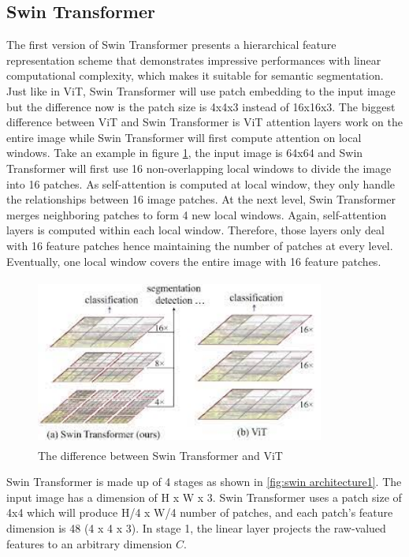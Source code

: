 \subsection{Swin Transformer}
The first version of Swin Transformer \cite{swin-v1} presents a hierarchical feature representation scheme that demonstrates impressive performances with linear computational complexity, which makes it suitable for semantic segmentation. Just like in ViT, Swin Transformer will use patch embedding to the input image but the difference now is the patch size is 4x4x3 instead of 16x16x3. The biggest difference between ViT and Swin Transformer is ViT attention layers work on the entire image while Swin Transformer will first compute attention on local windows. Take an example in figure \ref{fig:swin-vs-vit}, the input image is 64x64 and Swin Transformer will first use 16 non-overlapping local windows to divide the image into 16 patches. As self-attention is computed at local window, they only handle the relationships between 16 image patches. At the next level, Swin Transformer merges neighboring patches to form 4 new local windows. Again, self-attention layers is computed within each local window. Therefore, those layers only deal with 16 feature patches hence maintaining the number of patches at every level. Eventually, one local window covers the entire image with 16 feature patches.
\FloatBarrier
\begin{figure}[ht]
\centering
\includegraphics[width=9.5cm, height=5.5cm]{images/swin vs vit.png}
\caption{The difference between Swin Transformer and ViT \protect\cite{swin-v1}}
\label{fig:swin-vs-vit}
\end{figure}

Swin Transformer is made up of 4 stages as shown in \ref{fig:swin architecture1}. The input image has a dimension of H x W x 3. Swin Transformer uses a patch size of 4x4 which will produce H/4 x W/4 number of patches, and each patch’s feature dimension is 48 (4 x 4 x 3). In stage 1, the linear layer projects the raw-valued features to an arbitrary dimension $C$.

